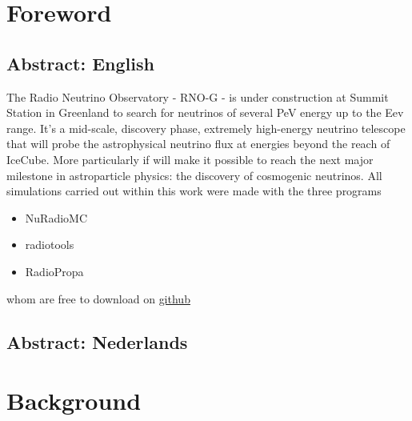 \documentclass[11pt,a4paper,faculty=we,language=en,doctype=report]{cls/ugent-doc}
\renewcommand{\ULthickness}{2pt} %
\begin{document}

\maketitle
\renewcommand{\ULthickness}{1pt}


{\hypersetup{hidelinks}\tableofcontents} %
\newpage


\chapter{Foreword}
\section{Abstract: English}
The Radio Neutrino Observatory - RNO-G - is under construction at Summit Station in Greenland to search for neutrinos of several PeV energy up to the Eev range. It's a mid-scale, discovery phase, extremely high-energy neutrino telescope that will probe the astrophysical neutrino flux at energies beyond the reach of IceCube.
More particularly if will make it possible to reach the next major milestone in astroparticle physics: the discovery of cosmogenic neutrinos.
\vspace{0.5cm}
All simulations carried out within this work were made with the three programs 
\begin{itemize}
	\item NuRadioMC
	\item radiotools
	\item RadioPropa
\end{itemize}
whom are free to download on \href{https://github.com/nu-radio}{github}
\section{Abstract: Nederlands}
\chapter{Background}
\end{document}

